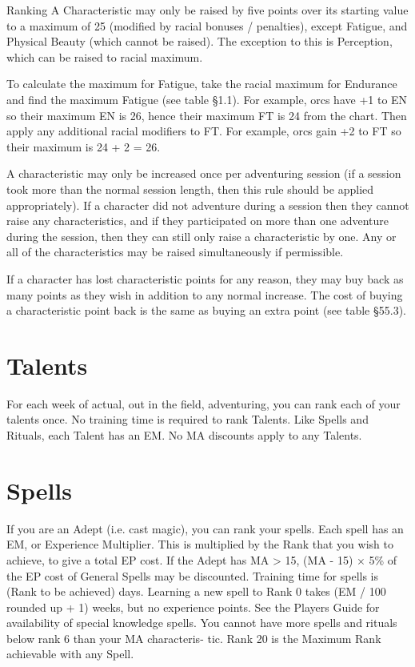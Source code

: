 \begin{Chapter}{Ranking}
A Characteristic may only be raised by five points over its starting
value to a maximum of 25 (modified by racial bonuses / penalties),
except Fatigue, and Physical Beauty (which cannot be raised). The
exception to this is Perception, which can be raised to racial
maximum.

To calculate the maximum for Fatigue, take the racial maximum for
Endurance and find the maximum Fatigue (see table §1.1).  For example,
orcs have +1 to EN so their maximum EN is 26, hence their maximum FT
is 24 from the chart. Then apply any additional racial modifiers to
FT. For example, orcs gain +2 to FT so their maximum is 24 + 2 = 26.

A characteristic may only be increased once per adventuring session
(if a session took more than the normal session length, then this rule
should be applied appropriately). If a character did not adventure
during a session then they cannot raise any characteristics, and if
they participated on more than one adventure during the session, then
they can still only raise a characteristic by one.  Any or all of the
characteristics may be raised simultaneously if permissible.

If a character has lost characteristic points for any reason, they may
buy back as many points as they wish in addition to any normal
increase. The cost of buying a characteristic point back is the same
as buying an extra point (see table §55.3).

\section{Talents}

For each week of actual, out in the field, adventuring, you can rank
each of your talents once.  No training time is required to rank
Talents.  Like Spells and Rituals, each Talent has an EM. No MA
discounts apply to any Talents.

\section{Spells}

If you are an Adept (i.e. cast magic), you can rank your spells.  Each
spell has an EM, or Experience Multiplier. This is multiplied by the
Rank that you wish to achieve, to give a total EP cost.  If the Adept
has MA > 15, (MA - 15) × 5\% of the EP cost of General Spells may be
discounted. Training time for spells is (Rank to be achieved) days.
Learning a new spell to Rank 0 takes (EM / 100 rounded up + 1) weeks,
but no experience points.  See the Players Guide for availability of
special knowledge spells.  You cannot have more spells and rituals
below rank 6 than your MA characteris- tic. Rank 20 is the Maximum
Rank achievable with any Spell.


\end{Chapter}
